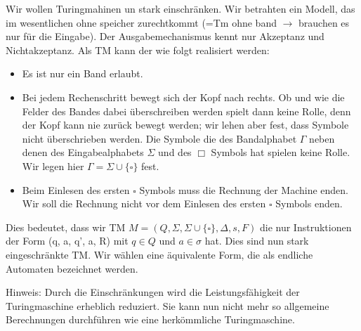 Wir wollen Turingmahinen un stark einschränken. Wir betrahten ein Modell, das im wesentlichen ohne speicher zurechtkommt (=Tm ohne band \(\longrightarrow\)  brauchen es nur für die Eingabe). Der Ausgabemechanismus kennt nur Akzeptanz und Nichtakzeptanz. Als TM kann der wie folgt realisiert werden:
\begin{itemize}
    \item Es ist nur ein Band erlaubt.
    \item Bei jedem Rechenschritt bewegt sich der Kopf nach rechts. Ob und wie die Felder des Bandes dabei überschreiben werden spielt dann keine Rolle, denn der Kopf kann nie zurück bewegt werden; wir lehen aber fest, dass Symbole nicht überschrieben werden. Die Symbole die des Bandalphabet \(\Gamma\)  neben denen des Eingabealphabets \(\Sigma\)  und des \(\Box\) Symbols hat spielen keine Rolle. Wir legen hier \(\varGamma  = \Sigma \cup  \{\square \}\) fest.
    \item Beim Einlesen des ersten \(\square\)  Symbols muss die Rechnung der Machine enden. Wir soll die Rechnung nicht vor dem Einlesen des ersten \(\square\) Symbols enden. 
\end{itemize}
Dies bedeutet, dass wir TM \(M = (Q, \Sigma, \Sigma \cup \{\square \}, \Delta, s, F)\) die nur Instruktionen der Form (q, a, q', a, R) mit \(q \in Q\) und \(a \in \sigma\) hat. Dies sind nun stark eingeschränkte TM. Wir wählen eine äquivalente Form, die als endliche Automaten bezeichnet werden. 

Hinweis: Durch die Einschränkungen wird die Leistungsfähigkeit der Turingmaschine erheblich reduziert. Sie kann nun nicht mehr so allgemeine Berechnungen durchführen wie eine herkömmliche Turingmaschine.

